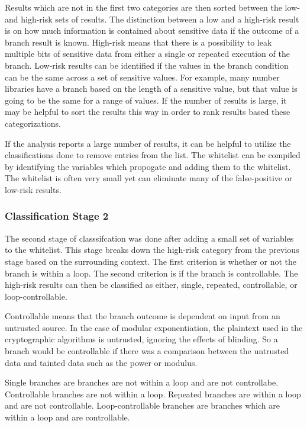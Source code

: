 \documentclass[11pt,a4paper]{article}
\begin{document}
 Results which are not in the first two categories are then sorted between the
 low- and high-risk sets of results. The distinction between a low and a
 high-risk result is on how much information is contained about sensitive data
 if the outcome of a branch result is known. High-risk means that there is a
 possibility to leak multiple bits of sensitive data from either a single or
 repeated execution of the branch. Low-risk results can be identified if the
 values in the branch condition can be the same across a set of sensitive
 values. For example, many number libraries have a branch based on the length of
 a sensitive value, but that value is going to be the same for a range of
 values. If the number of results is large, it may be helpful to sort the
 results this way in order to rank results based these categorizations.
 
 If the analysis reports a large number of results, it can be helpful to utilize
 the classifications done to remove entries from the list. The whitelist can be
 compiled by identifying the variables which propogate and adding them to the
 whitelist. The whitelist is often very small yet can eliminate many of the
 false-positive or low-risk results.

 \subsubsection{Classification Stage 2}

 The second stage of classsifcation was done after adding a small set of
 variables to the whitelist. This stage breaks down the high-risk category from the
 previous stage based on the surrounding context. The first criterion is whether
 or not the branch is within a loop. The second criterion is if the branch is
 controllable. The high-risk results can then be classified as either, single,
 repeated, controllable, or loop-controllable.

 Controllable means that the branch outcome is dependent on input from an
 untrusted source. In the case of modular exponentiation, the plaintext used in
 the cryptographic algorithms is untrusted, ignoring the effects of blinding. So
 a branch would be controllable if there was a comparison between the untrusted
 data and tainted data such as the power or modulus.

 Single branches are branches are not within a loop and are not controllabe.
 Controllable branches are not within a loop. Repeated branches are within a
 loop and are not controllable. Loop-controllable branches are branches which
 are within a loop and are controllable.
\end{document}
